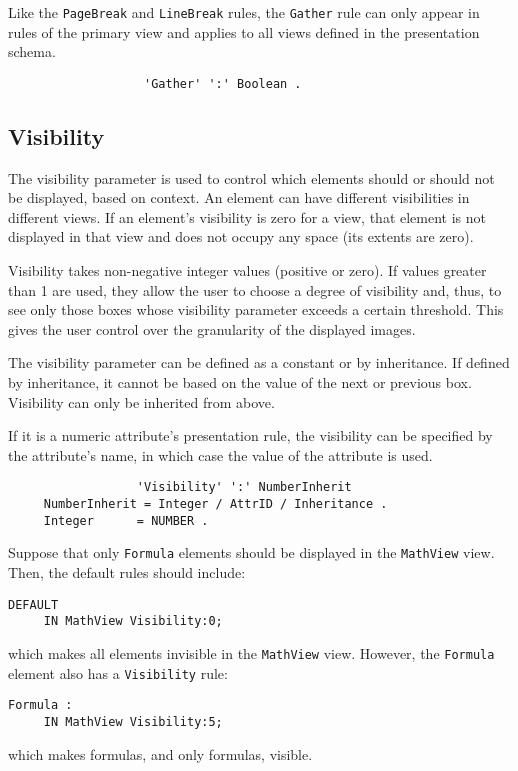 Like the {\tt PageBreak} and {\tt LineBreak} rules, the {\tt Gather}
rule can only appear in rules of the primary view and applies to all
views defined in the presentation schema.

\begin{verbatim}
                   'Gather' ':' Boolean .
\end{verbatim}

\subsection{Visibility}
\label{visib}

The visibility parameter is used to control which elements should or
should not be displayed, based on context.  An element can have
different visibilities in different views.  If an element's visibility
is zero for a view, that element is not displayed in that view and
does not occupy any space (its extents are zero).

Visibility takes non-negative integer values (positive or zero).  If
values greater than 1 are used, they allow the user to choose a degree
of visibility and, thus, to see only those boxes whose visibility
parameter exceeds a certain threshold.  This gives the user control
over the granularity of the displayed images.

The visibility parameter can be defined as a constant or by
inheritance.  If defined by inheritance, it cannot be based on the
value of the next or previous box.  Visibility can only be inherited
from above.

If it is a numeric attribute's presentation rule, the visibility can
be specified by the attribute's name, in which case the value of the
attribute is used.

\begin{verbatim}
                  'Visibility' ':' NumberInherit
     NumberInherit = Integer / AttrID / Inheritance .
     Integer      = NUMBER .
\end{verbatim}

\begin{example}
Suppose that only {\tt Formula} elements should be displayed in the
{\tt MathView} view.  Then, the default rules should include:
\begin{verbatim}
DEFAULT
     IN MathView Visibility:0;
\end{verbatim}
which makes all elements invisible in the {\tt MathView} view.
However, the {\tt Formula} element also has a {\tt Visibility} rule:

\begin{verbatim}
Formula :
     IN MathView Visibility:5;
\end{verbatim}
which makes formulas, and only formulas, visible.
\end{example}

